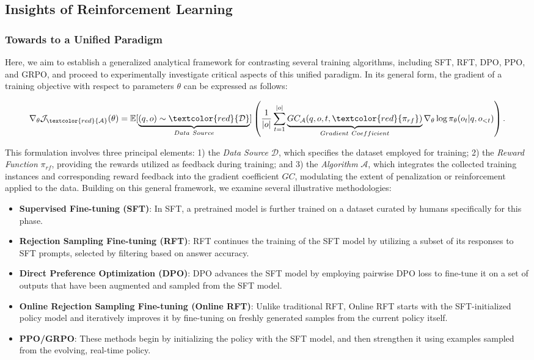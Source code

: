 \begin{itemize}[topsep=0pt]
\begin{itemize}[topsep=0pt]
\subsection{Insights of Reinforcement Learning}
\subsubsection{Towards to a Unified Paradigm} Here, we aim to establish a generalized analytical framework for contrasting several training algorithms, including SFT, RFT, DPO, PPO, and GRPO, and proceed to experimentally investigate critical aspects of this unified paradigm. In its general form, the gradient of a training objective with respect to parameters $\theta$ can be expressed as follows:

\begin{equation}
    \nabla_{\theta}\mathcal{J}_{\textcolor{red}{\mathcal{A}}}(\theta) = \mathbb{E}[\underbrace{(q,o) \sim \textcolor{red}{\mathcal{D}}}_{Data \ Source}]\left( \frac{1}{|o|} \sum_{t=1}^{|o|}  \underbrace{GC_{{\mathcal{A}}}(q, o, t, \textcolor{red}{\pi_{{rf}}})}_{Gradient \ Coefficient}  \nabla_{\theta}\log \pi_{\theta}(o_t | q, o_{<t})\right).
\label{eq:objective}
\end{equation}

This formulation involves three principal elements: 1) the \textit{Data Source} $\mathcal{D}$, which specifies the dataset employed for training; 2) the \textit{Reward Function} $\pi_{{rf}}$, providing the rewards utilized as feedback during training; and 3) the \textit{Algorithm} $\mathcal{A}$, which integrates the collected training instances and corresponding reward feedback into the gradient coefficient $GC$, modulating the extent of penalization or reinforcement applied to the data. Building on this general framework, we examine several illustrative methodologies:

\begin{itemize}
    \item \textbf{Supervised Fine-tuning (SFT)}: In SFT, a pretrained model is further trained on a dataset curated by humans specifically for this phase.
    \item \textbf{Rejection Sampling Fine-tuning (RFT)}: RFT continues the training of the SFT model by utilizing a subset of its responses to SFT prompts, selected by filtering based on answer accuracy.
    \item \textbf{Direct Preference Optimization (DPO)}: DPO advances the SFT model by employing pairwise DPO loss to fine-tune it on a set of outputs that have been augmented and sampled from the SFT model.
    \item \textbf{Online Rejection Sampling Fine-tuning (Online RFT)}: Unlike traditional RFT, Online RFT starts with the SFT-initialized policy model and iteratively improves it by fine-tuning on freshly generated samples from the current policy itself.
    \item \textbf{PPO/GRPO}: These methods begin by initializing the policy with the SFT model, and then strengthen it using examples sampled from the evolving, real-time policy.
\end{itemize}


\end{itemize}
\end{itemize}

